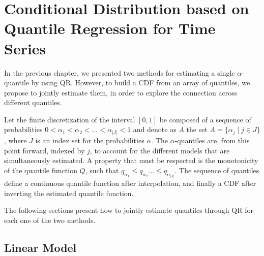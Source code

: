 \chapter{Conditional Distribution based on Quantile Regression for Time Series}

In the previous chapter, we presented two methods for estimating a single $\alpha$-quantile by using QR. However, to build a CDF from an array of quantiles, we propose to jointly estimate them, in order to explore the connection across different quantiles. 

Let the finite discretization of the interval $[0,1]$ be composed of a sequence of probabilities $0 < \alpha_1 < \alpha_2 < \dots < \alpha_{|J|} < 1$ and denote as $A$ the set $A = \{ \alpha_j \mid j \in J \}$, where $J$ is an index set for the probabilities $\alpha$. 
The $\alpha$-quantiles are, from this point forward, indexed by $j$, to account for the different models that are simultaneously estimated. A property that must be respected is the monotonicity of the quantile function $Q$, such that $q_{\alpha_1} \leq q_{\alpha_2} \dots \leq q_{\alpha_{|J|}}$.
The sequence of quantiles define a continuous quantile function after interpolation, and finally a CDF after inverting the estimated quantile function.

The following sections present how to jointly estimate quantiles through QR for each one of the two methods.



\section{Linear Model}

